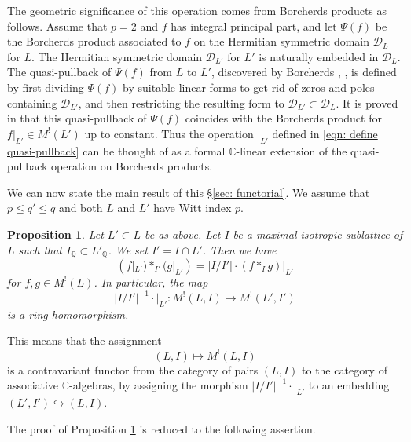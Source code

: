 \documentclass[12pt]{amsart}
\numberwithin{equation}{section}
\newtheorem{proposition}[theorem]{Proposition}
\theoremstyle{definition}
\theoremstyle{remark}
\newcommand{\Q}{\mathbb{Q}}
\newcommand{\C}{\mathbb{C}}
\newcommand{\ML}{M^{!}(L)}
\begin{document}
The geometric significance of this operation comes from Borcherds products as follows. 
Assume that $p=2$ and $f$ has integral principal part, 
and let $\Psi(f)$ be the Borcherds product associated to $f$ 
on the Hermitian symmetric domain $\mathcal{D}_{L}$ for $L$.   
The Hermitian symmetric domain $\mathcal{D}_{L'}$ for $L'$ 
is naturally embedded in $\mathcal{D}_{L}$. 
The quasi-pullback of $\Psi(f)$ from $L$ to $L'$, 
discovered by Borcherds \cite{Bo95}, \cite{B-K-P-SB},  
is defined by 
first dividing $\Psi(f)$ by suitable linear forms to get rid of zeros and poles containing $\mathcal{D}_{L'}$, 
and then restricting the resulting form to $\mathcal{D}_{L'}\subset \mathcal{D}_{L}$. 
It is proved in \cite{Ma} that this quasi-pullback of $\Psi(f)$ 
coincides with the Borcherds product for $f|_{L'}\in M^{!}(L')$ up to constant. 
Thus the operation $|_{L'}$ defined in \eqref{eqn: define quasi-pullback} 
can be thought of as a formal ${\C}$-linear extension of 
the quasi-pullback operation on Borcherds products. 

We can now state the main result of this \S \ref{sec: functorial}. 
We assume that $p\leq q' \leq q$ and both $L$ and $L'$ have Witt index $p$. 

\begin{proposition}\label{prop: functorial main}
Let $L'\subset L$ be as above. 
Let $I$ be a maximal isotropic sublattice of $L$ 
such that $I_{{\Q}}\subset L'_{{\Q}}$. 
We set $I'=I\cap L'$. 
Then we have 
\begin{equation*}\label{eqn: functorial}
(f|_{L'})\ast_{I'}(g|_{L'}) = |I/I'|\cdot (f\ast_{I}g)|_{L'} 
\end{equation*}
for $f, g \in {\ML}$. 
In particular, the map
\begin{equation*} 
|I/I'|^{-1}\cdot |_{L'} : M^!(L, I) \to M^{!}(L', I') 
\end{equation*}
is a ring homomorphism. 
\end{proposition}


This means that the assignment 
\begin{equation*}
(L, I) \mapsto M^{!}(L, I) 
\end{equation*}
is a contravariant functor 
from the category of pairs $(L, I)$ 
to the category of associative ${\C}$-algebras, 
by assigning the morphism $|I/I'|^{-1}\cdot |_{L'}$ 
to an embedding $(L', I')\hookrightarrow (L, I)$. 

The proof of Proposition \ref{prop: functorial main} is reduced to the following assertion. 
\end{document}
